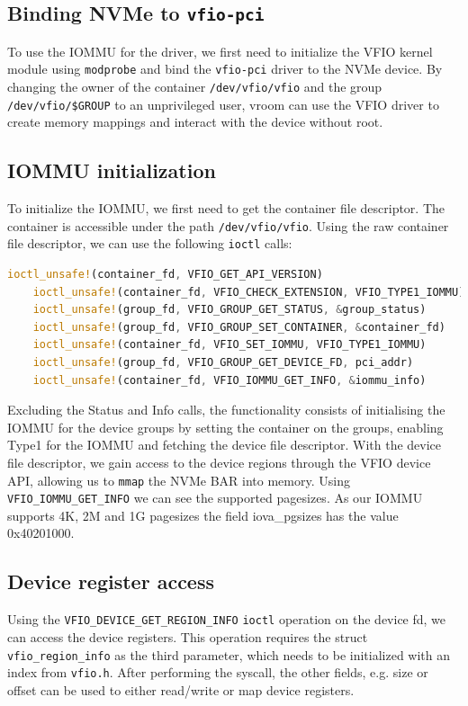 \subsection{Binding NVMe to \texttt{vfio-pci}}\label{sec:bindvfiopci}
To use the IOMMU for the driver, we first need to initialize the VFIO kernel module using \texttt{modprobe} and bind the \texttt{vfio-pci} driver to the NVMe device. By changing the owner of the container \texttt{/dev/vfio/vfio} and the group \texttt{/dev/vfio/\$GROUP} to an unprivileged user, vroom can use the VFIO driver to create memory mappings and interact with the device without root.

\subsection{IOMMU initialization}\label{sec:iommuinit}
To initialize the IOMMU, we first need to get the container file descriptor. The container is accessible under the path \texttt{/dev/vfio/vfio}. Using the raw container file descriptor, we can use the following \texttt{ioctl} calls:

\begin{lstlisting}[language=Rust, caption={\texttt{ioctl} calls needed for IOMMU initialization}, label=lst:containerioctls]
    ioctl_unsafe!(container_fd, VFIO_GET_API_VERSION)
    ioctl_unsafe!(container_fd, VFIO_CHECK_EXTENSION, VFIO_TYPE1_IOMMU)
    ioctl_unsafe!(group_fd, VFIO_GROUP_GET_STATUS, &group_status)
    ioctl_unsafe!(group_fd, VFIO_GROUP_SET_CONTAINER, &container_fd)
    ioctl_unsafe!(container_fd, VFIO_SET_IOMMU, VFIO_TYPE1_IOMMU)
    ioctl_unsafe!(group_fd, VFIO_GROUP_GET_DEVICE_FD, pci_addr)
    ioctl_unsafe!(container_fd, VFIO_IOMMU_GET_INFO, &iommu_info)   
\end{lstlisting}

Excluding the Status and Info calls, the functionality consists of initialising the IOMMU for the device groups by setting the container on the groups, enabling Type1 for the IOMMU and fetching the device file descriptor. With the device file descriptor, we gain access to the device regions through the VFIO device API, allowing us to \texttt{mmap} the NVMe BAR into memory. Using \texttt{VFIO\_IOMMU\_GET\_INFO} we can see the supported pagesizes. As our IOMMU supports 4K, 2M and 1G pagesizes the field iova\_pgsizes has the value 0x40201000.

\subsection{Device register access}\label{sec:pcieconfig}
Using the \texttt{VFIO\_DEVICE\_GET\_REGION\_INFO} \texttt{ioctl} operation on the device fd, we can access the device registers. This operation requires the struct \texttt{vfio\_region\_info} as the third parameter, which needs to be initialized with an index from \texttt{vfio.h}. After performing the syscall, the other fields, e.g. size or offset can be used to either read/write or map device registers.


